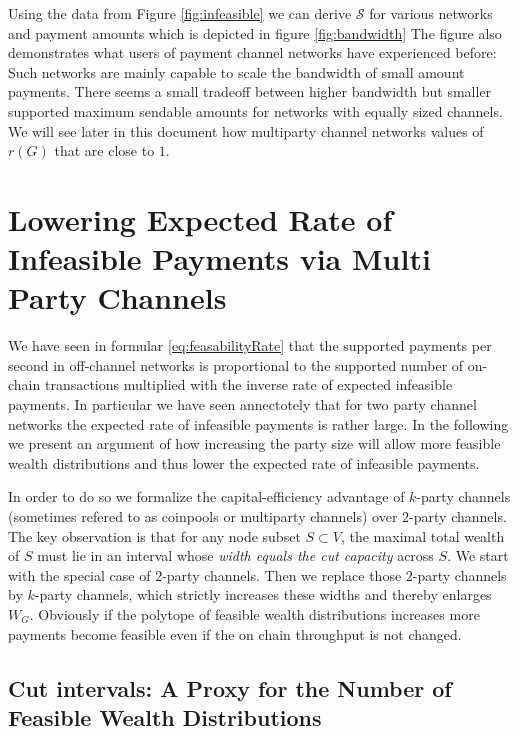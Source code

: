 \documentclass[10pt,twocolumn]{article}
\begin{document}
Using the data from Figure \ref{fig:infeasible} we can derive $\mathcal{S}$ for various networks and payment amounts which is depicted in figure \ref{fig:bandwidth}
The figure also demonstrates what users of payment channel networks have experienced before:
Such networks are mainly capable to scale the bandwidth of small amount payments.
There seems a small tradeoff between higher bandwidth but smaller supported maximum sendable amounts for networks with equally sized channels.
We will see later in this document how multiparty channel networks values of \( r(G) \) that are close to $1$.


\section{Lowering Expected Rate of Infeasible Payments via Multi Party Channels}
\label{sec:mpc-cuts}
We have seen in formular \ref{eq:feasabilityRate} that the supported payments per second in off-channel networks is proportional to the supported number of on-chain transactions multiplied with the inverse rate of expected infeasible payments. In particular we have seen annectotely that for two party channel networks the expected rate of infeasible payments is rather large. In the following we present an argument of how increasing the party size will allow more feasible wealth distributions and thus lower the expected rate of infeasible payments.%

In order to do so we formalize the capital-efficiency advantage of $k$-party channels (sometimes refered to as coinpools or multiparty channels) over $2$-party channels.
The key observation is that for any node subset $S\subset V$, the maximal total wealth of $S$ must lie in an interval whose \emph{width equals the cut capacity} across $S$.
We start with the special case of $2$-party channels. Then we replace those $2$-party channels by $k$-party channels, which strictly increases these widths and thereby enlarges $W_G$. Obviously if the polytope of feasible wealth distributions increases more payments become feasible even if the on chain throughput is not changed.

\subsection{Cut intervals: A Proxy for the Number of Feasible Wealth Distributions}
\label{subsec:cut-intervals}
\end{document}
